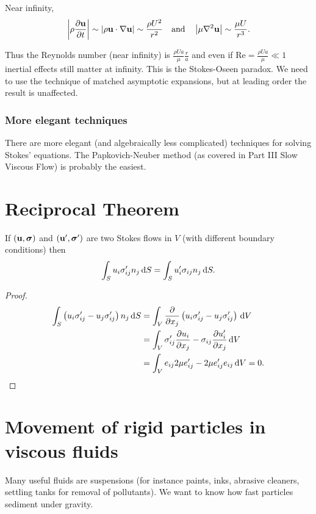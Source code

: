 \documentclass{notes}
\newcommand{\Rey}{\mathrm{Re}}
\newcommand{\bs}{\boldsymbol{\sigma}}
\theoremstyle{plain}
\begin{document}
Near infinity,
\[
\left|\rho \frac{\partial \mathbf{u}}{\partial t}\right| \sim \left|\rho \mathbf{u} \cdot \nabla \mathbf{u}\right|
\sim \frac{\rho U^2}{r^2} \quad \text{and} \quad
\left|\mu \nabla^2 \mathbf{u}\right| \sim \frac{\mu U}{r^3}.
\]

Thus the Reynolds number (near infinity) is $\frac{\rho U a}{\mu}
\frac{r}{a}$ and even if $\Rey = \frac{\rho U a}{\mu} \ll 1$ inertial
effects still matter at infinity.  This is the Stokes-Oseen paradox.
We need to use the technique of matched asymptotic expansions, but at
leading order the result is unaffected.

\subsubsection*{More elegant techniques}

There are more elegant (and algebraically less complicated) techniques
for solving Stokes' equations.  The Papkovich-Neuber method (as
covered in Part III Slow Viscous Flow) is probably the easiest.

\section{Reciprocal Theorem}

If $(\vu,\bs)$ and $(\vu',\bs')$ are two Stokes flows in $V$ (with different
boundary conditions) then
\[
\int_S u_i \sigma'_{i j} n_j\, \mathrm{d} S = \int_S u'_i \sigma_{i j} n_j\, \mathrm{d} S.
\]

\begin{proof}
\begin{align*}
\int_S \left( u_i \sigma'_{i j} - u_j \sigma'_{i j}\right) n_j\, \mathrm{d} S
&= \int_V \frac{\partial }{\partial x_j} \left( u_i \sigma'_{i j} - u_j \sigma'_{i j}
\right)\, \mathrm{d} V \\
&= \int_V \sigma'_{i j} \frac{\partial u_i}{\partial x_j} - \sigma_{i j} \frac{\partial u'_i}{\partial x_j}\,
\mathrm{d} V \\
&= \int_V e_{i j} 2 \mu e'_{i j} - 2 \mu e'_{i j} e_{i j}\, \mathrm{d} V = 0.
\end{align*}
\end{proof}

\section{Movement of rigid particles in viscous fluids}

Many useful fluids are suspensions (for instance paints, inks,
abrasive cleaners, settling tanks for removal of pollutants).  We want
to know how fast particles sediment under gravity.
\end{document}

